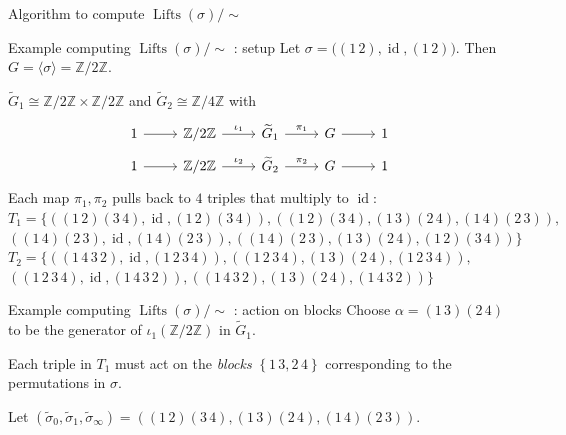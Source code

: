 \documentclass[handout,xcolor=dvipsnames]{beamer}
\theoremstyle{plain}
\newcommand{\ZZ}{\mathbb Z}
\newcommand{\wt}[1]{\widetilde{#1}}
\DeclareMathOperator{\Lifts}{Lifts}
\DeclareMathOperator{\id}{id}
\begin{document}
{\begin{frame}[fragile]{Algorithm to compute $\Lifts(\sigma)/\!\!\sim$}
\begin{enumerate}
      \end{enumerate}
    \end{frame}
    \begin{frame}[fragile]{Example computing $\Lifts(\sigma)/\!\!\sim$ : setup}
      Let $\sigma = \big((1\,2),\id,(1\,2)\big)$.
      Then $G = \langle\sigma\rangle = \ZZ/2\ZZ$.
      \pause\par
      $\wt{G}_1\cong\ZZ/2\ZZ\times\ZZ/2\ZZ$
      and
      $\wt{G}_2\cong\ZZ/4\ZZ$ with
      \begin{align*}
        \begin{tikzcd}[ampersand replacement=\&, row sep = small]
          1\arrow{r}\&\ZZ/2\ZZ\arrow{r}{\iota_1}\&\wt{G}_1\arrow{r}{\pi_1}\&G\arrow{r}\&1
        \end{tikzcd}
        \\
        \begin{tikzcd}[ampersand replacement=\&, row sep = small]
          1\arrow{r}\&\ZZ/2\ZZ\arrow{r}{\iota_2}\&\wt{G}_2\arrow{r}{\pi_2}\&G\arrow{r}\&1
        \end{tikzcd}
      \end{align*}
      \pause
      Each map $\pi_1,\pi_2$ pulls back to
      $4$ triples that multiply to $\id$:
      \pause
      $T_1=
      \Big\{((1\,2)(3\,4), \id, (1\,2)(3\,4)),
      ((1\,2)(3\,4), (1\,3)(2\,4), (1\,4)(2\,3)),$
      $((1\,4)(2\,3), \id, (1\,4)(2\,3)),
      ((1\,4)(2\,3), (1\,3)(2\,4), (1\,2)(3\,4))
      \Big\}$
      \pause
      $T_2=
      \Big\{
      ((1\,4\,3\,2), \id, (1\,2\,3\,4)),
      ((1\,2\,3\,4), (1\,3)(2\,4), (1\,2\,3\,4)),$
      $((1\,2\,3\,4), \id, (1\,4\,3\,2)),
      ((1\,4\,3\,2), (1\,3)(2\,4), (1\,4\,3\,2))
      \Big\}$
    \end{frame}
    \begin{frame}{Example computing $\Lifts(\sigma)/\!\!\sim$ : action on blocks}
      Choose $\alpha=(1\,3)(2\,4)$ to be
      the generator of $\iota_1(\ZZ/2\ZZ)$
      in $\wt{G}_1$.
      \pause\par
      Each triple in
      $T_1$ must act on the
      \emph{blocks}
      $\left\{\boxed{1\,3},\boxed{2\,4}\right\}$
      corresponding to the permutations in
      $\sigma$.
      \pause\par
      Let
      $(\wt{\sigma}_0,\wt{\sigma}_1,\wt{\sigma}_\infty)=
      ((1\,2)(3\,4), (1\,3)(2\,4), (1\,4)(2\,3))$.
      \pause\par

\end{frame}}
\end{document}
